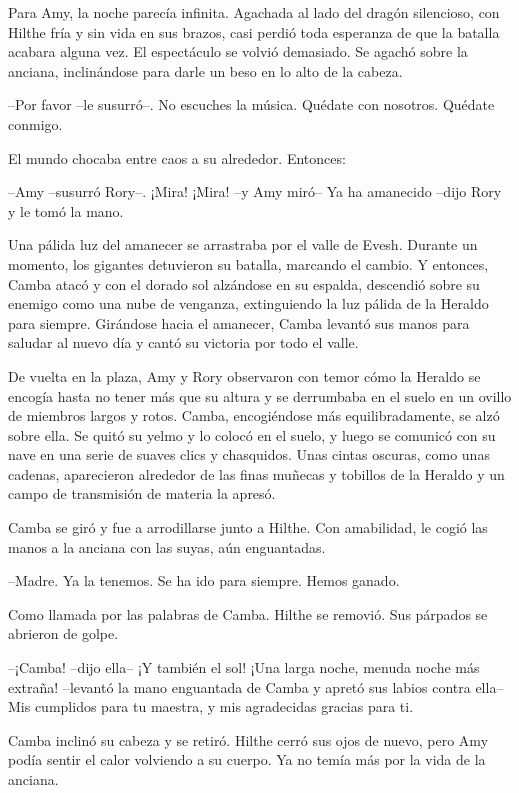 {Para Amy, la noche parecía infinita. Agachada al lado del dragón
	silencioso, con Hilthe fría y sin vida en sus brazos, casi perdió toda
	esperanza de que la batalla acabara alguna vez. El espectáculo se volvió
	demasiado. Se agachó sobre la anciana, inclinándose para darle un beso
en lo alto de la cabeza.}

{--Por favor --le susurró--. No escuches la música. Quédate con
nosotros. Quédate conmigo.}

{El mundo chocaba entre caos a su alrededor. Entonces:}

{--Amy --susurró Rory--. ¡Mira! ¡Mira! --y Amy miró-- Ya ha amanecido
--dijo Rory y le tomó la mano.}

{Una pálida luz del amanecer se arrastraba por el valle de Evesh.
	Durante un momento, los gigantes detuvieron su batalla, marcando el
	cambio. Y entonces, Camba atacó y con el dorado sol alzándose en su
	espalda, descendió sobre su enemigo como una nube de venganza,
	extinguiendo la luz pálida de la Heraldo para siempre. Girándose hacia
	el amanecer, Camba levantó sus manos para saludar al nuevo día y cantó
su victoria por todo el valle.}

{De vuelta en la plaza, Amy y Rory observaron con temor cómo la Heraldo
	se encogía hasta no tener más que su altura y se derrumbaba en el suelo
	en un ovillo de miembros largos y rotos. Camba, encogiéndose más
	equilibradamente, se alzó sobre ella. Se quitó su yelmo y lo colocó en
	el suelo, y luego se comunicó con su nave en una serie de suaves clics y
	chasquidos. Unas cintas oscuras, como unas cadenas, aparecieron
	alrededor de las finas muñecas y tobillos de la Heraldo y un campo de
transmisión de materia la apresó.}

{Camba se giró y fue a arrodillarse junto a Hilthe. Con amabilidad, le
cogió las manos a la anciana con las suyas, aún enguantadas.}

{--Madre. Ya la tenemos. Se ha ido para siempre. Hemos ganado.}

{Como llamada por las palabras de Camba. Hilthe se removió. Sus párpados
se abrieron de golpe.}

{--¡Camba! --dijo ella-- ¡Y también el sol! ¡Una larga noche, menuda
	noche más extraña! --levantó la mano enguantada de Camba y apretó sus
	labios contra ella-- Mis cumplidos para tu maestra, y mis agradecidas
gracias para ti.}

{Camba inclinó su cabeza y se retiró. Hilthe cerró sus ojos de nuevo,
	pero Amy podía sentir el calor volviendo a su cuerpo. Ya no temía más
por la vida de la anciana.}


